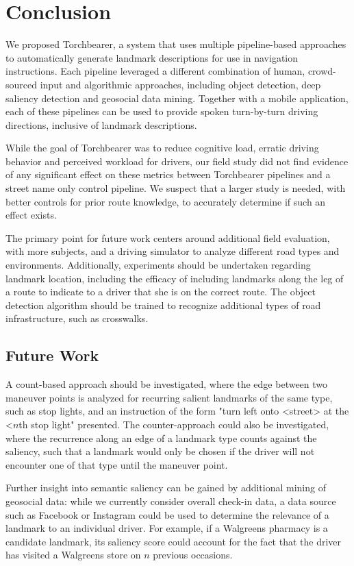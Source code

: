 \chapter{Conclusion}\label{conclusion}

We proposed Torchbearer, a system that uses multiple pipeline-based approaches to automatically generate landmark descriptions for use in navigation instructions. Each pipeline leveraged a different combination of human, crowd-sourced input and algorithmic approaches, including object detection, deep saliency detection and geosocial data mining. Together with a mobile application, each of these pipelines can be used to provide spoken turn-by-turn driving directions, inclusive of landmark descriptions.

While the goal of Torchbearer was to reduce cognitive load, erratic driving behavior and perceived workload for drivers, our field study did not find evidence of any significant effect on these metrics between Torchbearer pipelines and a street name only control pipeline. We suspect that a larger study is needed, with better controls for prior route knowledge, to accurately determine if such an effect exists.

The primary point for future work centers around additional field evaluation, with more subjects, and a driving simulator to analyze different road types and environments. Additionally, experiments should be undertaken regarding landmark location, including the efficacy of including landmarks along the leg of a route to indicate to a driver that she is on the correct route. The object detection algorithm should be trained to recognize additional types of road infrastructure, such as crosswalks.

\section{Future Work}

A count-based approach should be investigated, where the edge between two maneuver points is analyzed for recurring salient landmarks of the same type, such as stop lights, and an instruction of the form "turn left onto <street> at the <$n$th stop light" presented. The counter-approach could also be investigated, where the recurrence along an edge of a landmark type counts against the saliency, such that a landmark would only be chosen if the driver will not encounter one of that type until the maneuver point.

Further insight into semantic saliency can be gained by additional mining of geosocial data: while we currently consider overall check-in data, a data source such as Facebook or Instagram could be used to determine the relevance of a landmark to an individual driver. For example, if a Walgreens pharmacy is a candidate landmark, its saliency score could account for the fact that the driver has visited a Walgreens store on $n$ previous occasions.

